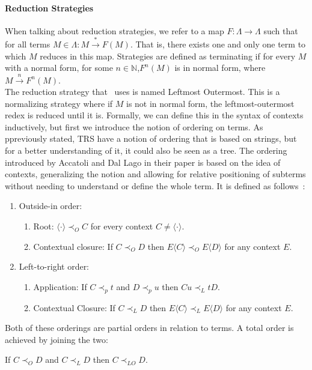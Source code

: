 \documentclass[12pt]{article}
\begin{document}
\paragraph{Reduction Strategies}
When talking about reduction strategies, we refer to a map $F : \Lambda \rightarrow \Lambda$ such that for all terms $M \in \Lambda : M \xrightarrow{*} F(M)$. That is, there exists one and only one term to which $M$ reduces in this map. Strategies are defined as terminating if for every $M$ with a normal form, for some $n \in \mathbb{N}$,$ F^{n} (M)$ is in normal form, where $M \xrightarrow{n} F^n(M)$. \\
The reduction strategy that~\cite{beta-invariance} uses is named Leftmost Outermost. This is a normalizing strategy where if $M$ is not in normal form, the leftmost-outermost redex is reduced until it is. Formally, we can define this in the syntax of contexts inductively, but first we introduce the notion of ordering on terms. As ppreviously stated, TRS have a notion of ordering that is based on strings, but for a better understanding of it, it could also be seen as a tree. The ordering introduced by Accatoli and Dal Lago in their paper is based on the idea of contexts, generalizing the notion and allowing for relative positioning of subterms without needing to understand or define the whole term. It is defined as follows~\cite{beta-invariance}:
\begin{enumerate}
  \item Outside-in order:
        \begin{enumerate}
          \item Root: $\langle \cdot \rangle \prec_{O} C$ for every context $C \neq \langle \cdot \rangle$.
          \item Contextual closure: If $C \prec_{O} D$ then $E\langle C \rangle \prec_{O} E\langle D \rangle $ for any context $E$.
        \end{enumerate}
  \item Left-to-right order:
        \begin{enumerate}
          \item Application: If $C \prec_{p} t$ and $D \prec_{p} u$ then $Cu \prec_{L} tD$.
          \item Contextual Closure: If $C \prec_{L} D$ then  $E\langle C \rangle \prec_{L} E\langle D\rangle$ for any context $E$.
        \end{enumerate}
\end{enumerate}
Both of these orderings are partial orders in relation to terms. A total order is achieved by joining the two:
\begin{center}
  If $C \prec_{O} D$ and $C \prec_{L} D$ then $C \prec_{LO} D$.
\end{center}
\end{document}
